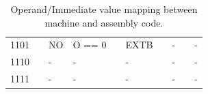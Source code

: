 \begin{table}
\begin{subtable}{\linewidth}
\begin{center}
\begin{tabular}{l|lll|ll|ll|ll}
1101            &         & NO        & O == 0                          &                 & EXTB          &       & -        &       & -           \\
1110            &         & -         & -                               &                 & -             &       & -        &       & -           \\
1111            &         & -         & -                               &                 & -             &       & -        &       & -           \\ \hline
\end{tabular}
\end{center}
\captionsetup{font=scriptsize, labelfont=scriptsize}
\caption{Relationship between operand field used in machine code and operands used in assembly code.
When width of sz field is 1, 0 and 1 in machine code correspond to 0 and 1 in assembly code.}
\end{subtable}
\captionsetup{font=scriptsize, labelfont=scriptsize}
\caption{Operand/Immediate value mapping between machine and assembly code.}
\end{table}
